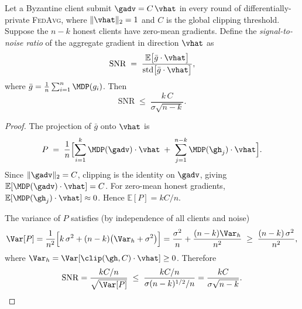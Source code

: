 %
%
%   


\begin{theorem}
\label{thm:snr-upper}
Let a Byzantine client submit $\gadv = C\,\vhat$ in every round of
differentially-private \textsc{FedAvg}, where $\|\vhat\|_2=1$ and $C$ is
the global clipping threshold.  Suppose the $n-k$ honest clients have
zero-mean gradients.  Define the \emph{signal-to-noise ratio} of the
aggregate gradient in direction $\vhat$ as
\[
  \mathrm{SNR} \;=\; \frac{\mathbb{E}\bigl[\bar{g}\cdot\vhat\bigr]}
                          {\mathrm{std}\bigl[\bar{g}\cdot\vhat\bigr]},
\]
where $\bar{g} = \frac{1}{n}\sum_{i=1}^n \MDP(g_i)$.
Then
\[
  \boxed{\mathrm{SNR} \;\le\; \frac{k\,C}{\sigma\sqrt{n-k}}.}
\]

\begin{proof}
The projection of $\bar{g}$ onto $\vhat$ is
\[
  P \;=\; \frac{1}{n}\Bigl[
    \sum_{i=1}^{k} \MDP(\gadv)\cdot\vhat
    \;+\; \sum_{j=1}^{n-k} \MDP(\gh_j)\cdot\vhat
  \Bigr].
\]
Since $\|\gadv\|_2 = C$, clipping is the identity on $\gadv$, giving
$\mathbb{E}[\MDP(\gadv)\cdot\vhat] = C$.  For zero-mean honest gradients,
$\mathbb{E}[\MDP(\gh_j)\cdot\vhat]\approx 0$.  Hence $\mathbb{E}[P] = kC/n$.

The variance of $P$ satisfies (by independence of all clients and noise)
\[
  \Var[P]
    = \frac{1}{n^2}\Bigl[k\,\sigma^2 + (n-k)\bigl(\Var_h+\sigma^2\bigr)\Bigr]
    = \frac{\sigma^2}{n} + \frac{(n-k)\Var_h}{n^2}
    \;\ge\; \frac{(n-k)\,\sigma^2}{n^2},
\]
where $\Var_h = \Var[\clip(\gh,C)\cdot\vhat]\ge 0$.  Therefore
\[
  \mathrm{SNR}
  = \frac{kC/n}{\sqrt{\Var[P]}}
  \;\le\; \frac{kC/n}{\sigma(n-k)^{1/2}/n}
  = \frac{kC}{\sigma\sqrt{n-k}}.\qedhere
\]
\end{proof}
\end{theorem}

